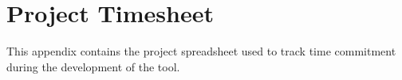 \chapter{Project Timesheet}
\label{chap:timesheet}

This appendix contains the project spreadsheet used to track time commitment
during the development of the tool.


